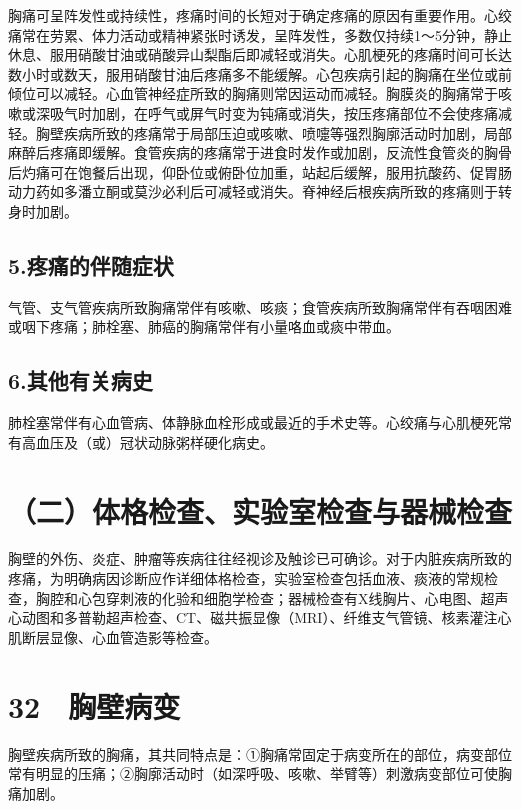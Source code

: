胸痛可呈阵发性或持续性，疼痛时间的长短对于确定疼痛的原因有重要作用。心绞痛常在劳累、体力活动或精神紧张时诱发，呈阵发性，多数仅持续1～5分钟，静止休息、服用硝酸甘油或硝酸异山梨酯后即减轻或消失。心肌梗死的疼痛时间可长达数小时或数天，服用硝酸甘油后疼痛多不能缓解。心包疾病引起的胸痛在坐位或前倾位可以减轻。心血管神经症所致的胸痛则常因运动而减轻。胸膜炎的胸痛常于咳嗽或深吸气时加剧，在呼气或屏气时变为钝痛或消失，按压疼痛部位不会使疼痛减轻。胸壁疾病所致的疼痛常于局部压迫或咳嗽、喷嚏等强烈胸廓活动时加剧，局部麻醉后疼痛即缓解。食管疾病的疼痛常于进食时发作或加剧，反流性食管炎的胸骨后灼痛可在饱餐后出现，仰卧位或俯卧位加重，站起后缓解，服用抗酸药、促胃肠动力药如多潘立酮或莫沙必利后可减轻或消失。脊神经后根疾病所致的疼痛则于转身时加剧。

\subsection{5.疼痛的伴随症状}

气管、支气管疾病所致胸痛常伴有咳嗽、咳痰；食管疾病所致胸痛常伴有吞咽困难或咽下疼痛；肺栓塞、肺癌的胸痛常伴有小量咯血或痰中带血。

\subsection{6.其他有关病史}

肺栓塞常伴有心血管病、体静脉血栓形成或最近的手术史等。心绞痛与心肌梗死常有高血压及（或）冠状动脉粥样硬化病史。

\section{（二）体格检查、实验室检查与器械检查}

胸壁的外伤、炎症、肿瘤等疾病往往经视诊及触诊已可确诊。对于内脏疾病所致的疼痛，为明确病因诊断应作详细体格检查，实验室检查包括血液、痰液的常规检查，胸腔和心包穿刺液的化验和细胞学检查；器械检查有X线胸片、心电图、超声心动图和多普勒超声检查、CT、磁共振显像（MRI）、纤维支气管镜、核素灌注心肌断层显像、心血管造影等检查。

\protect\hypertarget{text00093.html}{}{}

\section{32　胸壁病变}

胸壁疾病所致的胸痛，其共同特点是：①胸痛常固定于病变所在的部位，病变部位常有明显的压痛；②胸廓活动时（如深呼吸、咳嗽、举臂等）刺激病变部位可使胸痛加剧。

